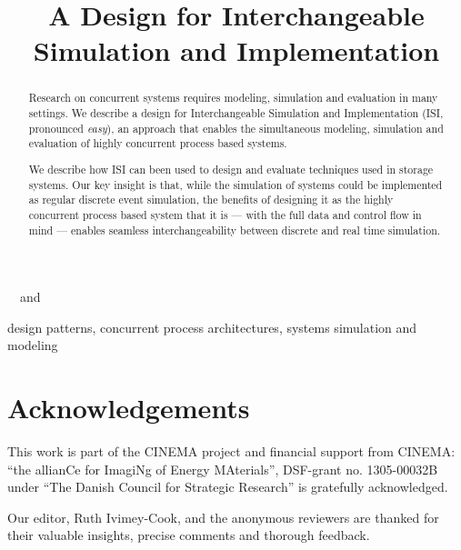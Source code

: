 \documentclass[12pt]{cpa2015}
\begin{document}
\begin{frontmatter}

\setcounter{page}{1}


\title{A Design for Interchangeable\\Simulation and Implementation}

\author{  }~~and~~\author{ }
\address{Niels Bohr Institute, University of Copenhagen, Denmark\\[4pt]%
	{\small \{{\tt birkelund}~,~{\tt vinter\}{\tt @nbi.ku.dk}}}
}

\begin{abstract}
Research on concurrent systems requires modeling, simulation and
evaluation in many settings. We describe a design for Interchangeable
Simulation and Implementation (ISI, pronounced \emph{easy}), an approach that enables the simultaneous
modeling, simulation and evaluation of highly concurrent process based systems.

We describe how ISI can been used to design and evaluate techniques used in
storage systems. Our key insight is that, while the simulation of systems could
be implemented as regular discrete event simulation, the benefits of designing
it as the highly concurrent process based system that it is --- with the full data
and control flow in mind --- enables seamless interchangeability between
discrete and real time simulation.
\end{abstract}

\begin{keyword}
design patterns\sep
concurrent process architectures\sep
systems simulation and modeling
\end{keyword}
\end{frontmatter}







\section*{Acknowledgements}
This work is part of the CINEMA project and financial support from CINEMA: “the
allianCe for ImagiNg of Energy MAterials”, DSF-grant no. 1305-00032B under “The
Danish Council for Strategic Research” is gratefully acknowledged.

Our editor, Ruth Ivimey-Cook, and the anonymous reviewers are thanked for their
valuable insights, precise comments and thorough feedback.


{\small}
\end{document}
